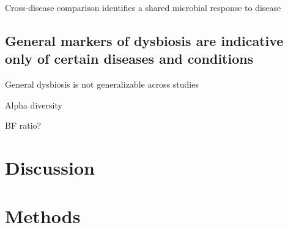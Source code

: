 \documentclass{article}
\begin{document}
Cross-disease comparison identifies a shared microbial response to disease

\subsection{General markers of dysbiosis are indicative only of certain diseases and conditions}
General dysbiosis is not generalizable across studies 

Alpha diversity

BF ratio?

\section{Discussion}

\section{Methods}



\end{document}
